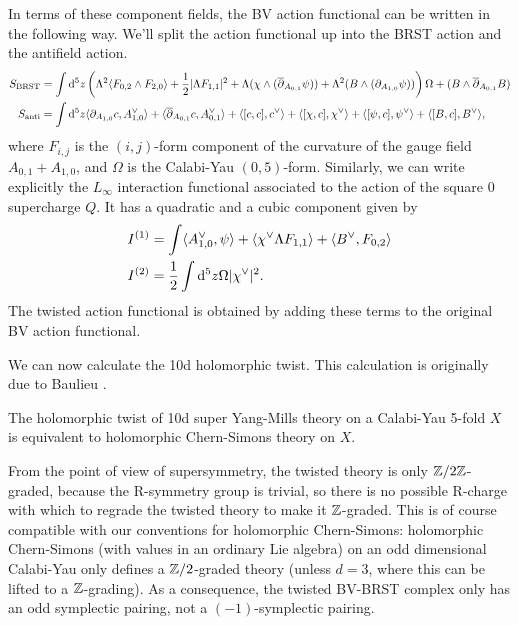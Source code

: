 \documentclass[10pt, oneside]{article}
\begin{document}
In terms of these component fields, the BV action functional can be written in the following way.  We'll split the action functional up into the BRST action and the antifield action.
\begin{align*}
S_{\mathrm{BRST}} &= \int {\rm d}^5z \left(\Lambda^2 \langle F_{0,2} \wedge F_{2,0}\rangle + \frac 12 |\Lambda F_{1,1}|^2 + \Lambda( \chi \wedge (\overline{\partial}_{A_{0,1}} \psi))  + \Lambda^2(B \wedge (\partial_{A_{1,0}} \psi))\right) \Omega + (B \wedge \overline{\partial}_{A_{0,1}} B) \\
S_{\mathrm{anti}} &= \int {\rm d}^5z \langle \partial_{A_{1,0}}c, A_{1,0}^\vee \rangle +  \langle \overline{\partial}_{A_{0,1}}c, A_{0,1}^\vee \rangle + \langle [c,c], c^\vee \rangle + \langle [\chi,c], \chi^\vee \rangle + \langle [\psi,c], \psi^\vee \rangle + \langle [B,c], B^\vee \rangle,
\end{align*}
where $F_{i,j}$ is the $(i,j)$-form component of the curvature of the gauge field $A_{0, 1} + A_{1, 0}$, and $\Omega$ is the Calabi-Yau $(0,5)$-form.  Similarly, we can write explicitly the $L_\infty$ interaction functional associated to the action of the square 0 supercharge $Q$.  It has a quadratic and a cubic component given by
\begin{align*}
I^{(1)} &= \int \langle A_{1,0}^\vee, \psi \rangle + \langle \chi^\vee \Lambda F_{1,1} \rangle + \langle B^\vee, F_{0,2} \rangle \\
I^{(2)} &= \frac 12 \int {\rm d}^5z \Omega |\chi^\vee|^2.
\end{align*}
The twisted action functional is obtained by adding these terms to the original BV action functional.

We can now calculate the 10d holomorphic twist.  This calculation is originally due to Baulieu \cite{Baulieu}.

\begin{theorem}
The holomorphic twist of 10d super Yang-Mills theory on a Calabi-Yau 5-fold $X$ is equivalent to holomorphic Chern-Simons theory on $X$.
\end{theorem}

\begin{remark}
From the point of view of supersymmetry, the twisted theory is only $\mathbb Z/2\mathbb Z$-graded, because the R-symmetry group is trivial, so there is no possible R-charge with which to regrade the twisted theory to make it $\mathbb Z$-graded.  
This is of course compatible with our conventions for holomorphic Chern-Simons: holomorphic Chern-Simons (with values in an ordinary Lie algebra) on an odd dimensional Calabi-Yau only defines a $\mathbb Z/2$-graded theory (unless $d=3$, where this can be lifted to a $\mathbb Z$-grading). 
As a consequence, the twisted BV-BRST complex only has an odd symplectic pairing, not a $(-1)$-symplectic pairing.
\end{remark}
\end{document}

